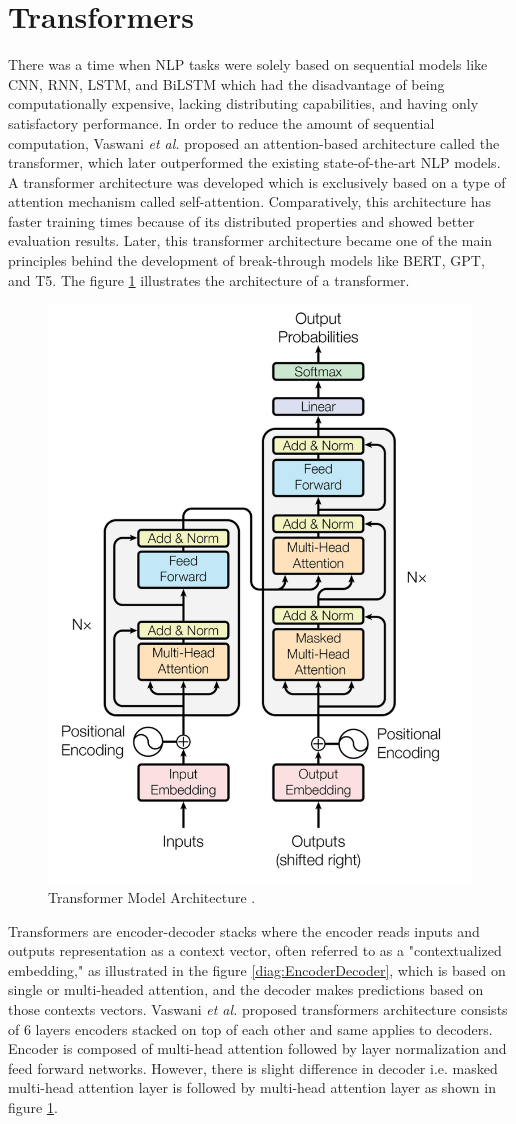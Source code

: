 \documentclass[%
	BCOR=8mm, %
	DIV=12,
	toc=bibliography, %
	toc=listof, %
	oneside, %
	egregdoesnotlikesansseriftitles, %
	]{scrbook}
\begin{document}
\section{Transformers}
\label{section: transformers}
There was a time when NLP tasks were solely based on sequential models like CNN, RNN, LSTM, and BiLSTM which had the disadvantage of being computationally expensive, lacking distributing capabilities, and having only satisfactory performance. In order to reduce the amount of sequential computation,  Vaswani \textit{et al.} \cite{vaswani_attention_2017} proposed an attention-based architecture called the transformer, which later outperformed the existing state-of-the-art NLP models. A transformer architecture was developed which is exclusively based on a type of attention mechanism called self-attention. Comparatively, this architecture has faster training times because of its distributed properties and showed better evaluation results. 
Later, this transformer architecture became one of the main principles behind the development of break-through models like BERT, GPT, and T5. The figure \ref{diag:TransformerArchitecture} illustrates the architecture of a transformer.

\begin{figure}[h!]
    \centering
    \includegraphics[width=.50\textwidth]{img/TransformerArchitecture.png}
    \caption[Diagram of Transformer Architecture.]{Transformer Model Architecture \cite{vaswani_attention_2017}.}
    \label{diag:TransformerArchitecture}
\end{figure}
Transformers are encoder-decoder stacks where the encoder reads inputs and outputs representation as a context vector, often referred to as a "contextualized embedding," as illustrated in the figure \ref{diag:EncoderDecoder}, which is based on single or multi-headed attention, and the decoder makes predictions based on those contexts vectors. Vaswani \textit{et al.} \cite{vaswani_attention_2017} proposed transformers architecture consists of  6 layers encoders stacked on top of each other and same applies to decoders. Encoder is composed of multi-head attention followed by layer normalization and feed forward networks. However, there is slight difference in decoder i.e. masked multi-head attention layer is followed by multi-head attention layer as shown in figure  \ref{diag:TransformerArchitecture}.
\end{document}
